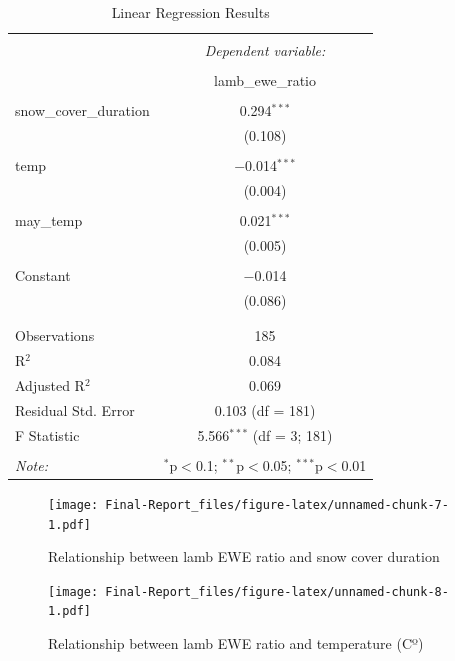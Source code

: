 \documentclass[
  12pt,
]{article}
\begin{document}
\begin{table}[!htbp] \centering 
  \caption{Linear Regression Results} 
  \label{} 
\begin{tabular}{@{\extracolsep{5pt}}lc} 
\\[-1.8ex]\hline 
\hline \\[-1.8ex] 
 & \multicolumn{1}{c}{\textit{Dependent variable:}} \\ 
\cline{2-2} 
\\[-1.8ex] & lamb\_ewe\_ratio \\ 
\hline \\[-1.8ex] 
 snow\_cover\_duration & 0.294$^{***}$ \\ 
  & (0.108) \\ 
  & \\ 
 temp & $-$0.014$^{***}$ \\ 
  & (0.004) \\ 
  & \\ 
 may\_temp & 0.021$^{***}$ \\ 
  & (0.005) \\ 
  & \\ 
 Constant & $-$0.014 \\ 
  & (0.086) \\ 
  & \\ 
\hline \\[-1.8ex] 
Observations & 185 \\ 
R$^{2}$ & 0.084 \\ 
Adjusted R$^{2}$ & 0.069 \\ 
Residual Std. Error & 0.103 (df = 181) \\ 
F Statistic & 5.566$^{***}$ (df = 3; 181) \\ 
\hline 
\hline \\[-1.8ex] 
\textit{Note:}  & \multicolumn{1}{r}{$^{*}$p$<$0.1; $^{**}$p$<$0.05; $^{***}$p$<$0.01} \\ 
\end{tabular} 
\end{table}

\begin{figure}
\centering
\texttt{[image: Final-Report\_files/figure-latex/unnamed-chunk-7-1.pdf]}
\caption{Relationship between lamb EWE ratio and snow cover duration}
\end{figure}

\begin{figure}
\centering
\texttt{[image: Final-Report\_files/figure-latex/unnamed-chunk-8-1.pdf]}
\caption{Relationship between lamb EWE ratio and temperature (Cº)}
\end{figure}
\end{document}

